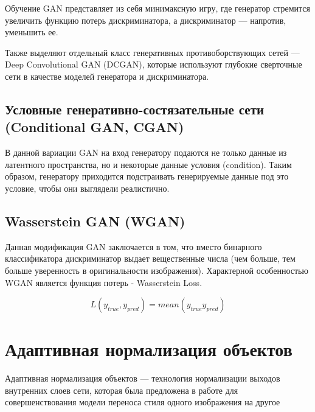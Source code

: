   

Обучение GAN представляет из себя минимаксную игру, где генератор стремится увеличить функцию потерь дискриминатора, а дискриминатор --- напротив, уменьшить ее. 

  

Также выделяют отдельный класс генеративных противоборствующих сетей --- Deep Convolutional GAN (DCGAN), которые используют глубокие сверточные сети в качестве моделей генератора и дискриминатора. 

  

\subsection{Условные генеративно-состязательные сети (Conditional GAN, CGAN)} 

  

В данной вариации GAN на вход генератору подаются не только данные из латентного пространства, но и некоторые данные условия (condition). Таким образом, генератору приходится подстраивать генерируемые данные под это условие, чтобы они выглядели реалистично. 

  

\subsection{Wasserstein GAN (WGAN) \cite{arjovsky2017wasserstein}} 

  

Данная модификация GAN заключается в том, что вместо бинарного классификатора дискриминатор выдает вещественные числа (чем больше, тем больше уверенность в оригинальности изображения). Характерной особенностью WGAN является функция потерь - Wasserstein Loss. 

  

\begin{equation} 

    L(y_{true}, y_{pred}) = mean(y_{true}y_{pred}) 

\end{equation} 

  

  

\section{Адаптивная нормализация объектов} 

  

Адаптивная нормализация объектов --- технология нормализации выходов внутренних слоев сети, которая была предложена в работе \cite{huang2017arbitrary} для совершенствования модели переноса стиля одного изображения на другое 

